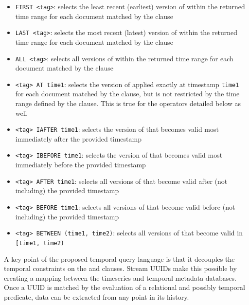 \begin{itemize}
\item \texttt{FIRST <tag>}: selects the least recent (earliest) version of  within the returned time range for each document matched by the  clause
\item \texttt{LAST <tag>}: selects the most recent (latest) version of  within the returned time range for each document matched by the  clause
\item \texttt{ALL <tag>}: selects all versions of  within the returned time range for each document matched by the  clause
\item \texttt{<tag> AT time1}: selects the version of  applied
    exactly at timestamp \texttt{time1} for each document matched by the
     clause, but is not restricted by the time range defined by the
     clause. This is true for the operators detailed below as well
\item \texttt{<tag> IAFTER time1}: selects the version of  that becomes valid most immediately after the provided timestamp
\item \texttt{<tag> IBEFORE time1}: selects the version of  that becomes valid most immediately before the provided timestamp
\item \texttt{<tag> AFTER time1}: selects all versions of  that become valid after (not including) the provided timestamp
\item \texttt{<tag> BEFORE time1}: selects all versions of  that become valid before (not including) the provided timestamp
\item \texttt{<tag> BETWEEN (time1, time2)}: selects all versions of  that become valid in \texttt{[time1, time2)}
\end{itemize}

A key point of the proposed temporal query language is that it decouples the temporal constraints on the  and  clauses.
Stream UUIDs make this possible by creating a mapping between the timeseries and temporal metadata databases. Once a UUID is matched by the evaluation
of a relational and possibly temporal predicate, data can be extracted from any point in its history.


